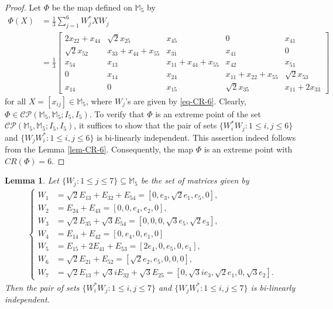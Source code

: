 \documentclass[10pt,reqno]{amsart}
\theoremstyle{definition}
\theoremstyle{plain}
\newtheorem{lem}[defn]{Lemma}
\theoremstyle{remark}
\newcommand{\mbb}[1]{\mathbb{#1}}
\newcommand{\msc}[1]{\mathscr{#1}}
\newcommand{\M}[1]{\mbb{M}_{#1}}%
\newcommand{\Matrix}[1]{\begin{bmatrix}#1\end{bmatrix}}
\numberwithin{equation}{section}%
\begin{document}
 \begin{proof}
	Let $\Phi$ be the map defined on $\M{5}$ by
	\begin{align*}
		\Phi(X)
		&=\frac{1}{3}\sum_{j=1}^{6}W_j^*XW_j\\
		&=\frac{1}{3}\Matrix{2x_{22}+x_{44}&\sqrt{2}x_{25}&x_{45}&0&x_{41}\\
			\sqrt{2}x_{52}&x_{33}+x_{44}+x_{55}&x_{31}&x_{41}&0\\
			x_{54}&x_{13}&x_{11}+x_{44}+x_{55}&x_{42}&x_{51}\\
			0&x_{14}&x_{24}&x_{11}+x_{22}+x_{55}&\sqrt{2}x_{53}\\
			x_{14}&0&x_{15}&\sqrt{2}x_{35}&x_{11}+2x_{33}}
	\end{align*}
	for all $X=[x_{ij}]\in\M{5}$, where $W_j$'s are given by \eqref{eq-CR-6}. Clearly, $\Phi\in\msc{CP}(\M{5},\M{5}; I_{5}, I_{5})$. To verify that $\Phi$ is an extreme point of the set $\msc{CP}(\M{5},\M{5}; I_{5}, I_{5})$, it suffices to show that the pair of sets $\{W_i^*W_j:1\leq i,j\leq 6\}$ and $\{W_jW_i^*:1\leq i,j\leq 6\}$ is bi-linearly independent. This assertion indeed follows from the Lemma \ref{lem-CR-6}. Consequently, the map $\Phi$ is an extreme point with $CR(\Phi)=6$.
\end{proof}



 \begin{lem}\label{lem-CR-7}
	Let $\{W_j:1\leq j\leq 7\}\subseteq\M{5}$ be the set of matrices given by
	\begin{align}\label{eq-CR-7}
		\begin{cases}
			W_1&=\sqrt{2}E_{13}+E_{32}+E_{54}=[0,e_3,\sqrt{2}e_1,e_5,0],\\
			W_2&=E_{24}+E_{43}=[0,0,e_4,e_2,0],\\
			W_3&=\sqrt{2}E_{35}+\sqrt{3}E_{54}=[0,0,0,\sqrt{3}e_5,\sqrt{2}e_3],\\
			W_4&=E_{14}+E_{42}=[0,e_4,0,e_1,0]\\
			W_5&=E_{15}+2E_{41}+E_{53}=[2e_4,0,e_5,0,e_1],\\
			W_6&=\sqrt{2}E_{21}+E_{52}=[\sqrt{2}e_2,e_5,0,0,0],\\
			W_7&=\sqrt{2}E_{13}+\sqrt{3}iE_{32}+\sqrt{3}E_{25}=[0,\sqrt{3}ie_3,\sqrt{2}e_1,0,\sqrt{3}e_2].
		\end{cases}
	\end{align}
	Then the pair of sets $\{W_i^*W_j:1\leq i,j\leq 7\}$ and $\{W_jW_i^*: 1\leq i,j\leq 7\}$ is bi-linearly independent.
\end{lem}
\end{document}
